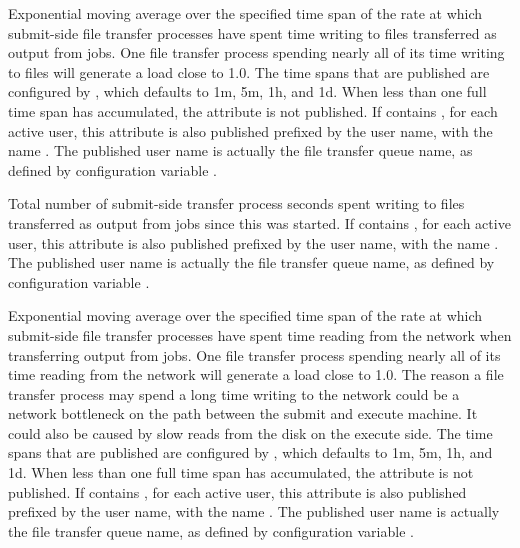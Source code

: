 \begin{description}
\item[\AdAttr{FileTransferFileWriteLoad\_<timespan>}]
  Exponential moving average over the specified time span of the rate
  at which submit-side file transfer processes have spent time writing to files
  transferred as output from jobs.  One file transfer process spending
  nearly all of its time writing to files will generate a load close
  to 1.0.
  The time spans that are published are configured by
  , which defaults to
  1m, 5m, 1h, and 1d.  When less than one full time span has
  accumulated, the attribute is not published.
  If  contains ,
  for each active user, this attribute is also published prefixed by
  the user name, with the name
  .
  The published user name is actually the file transfer queue name, as
  defined by configuration variable .

\item[\AdAttr{FileTransferFileWriteSeconds}] Total number of
  submit-side transfer process seconds spent writing to files
  transferred as output from jobs since this  was
  started.
  If  contains ,
  for each active user, this attribute is also published prefixed by
  the user name, with the name
  .
  The published user name is actually the file transfer queue name, as
  defined by configuration variable .

\item[\AdAttr{FileTransferNetReadLoad\_<timespan>}] Exponential moving
  average over the specified time span of the rate at which submit-side
  file transfer processes have spent time reading from the network
  when transferring output from jobs.  One file transfer process
  spending nearly all of its time reading from the network will
  generate a load close to 1.0.  The reason a file transfer process may
  spend a long time writing to the network could be a network
  bottleneck on the path between the submit and execute machine.  It
  could also be caused by slow reads from the disk on the execute side.
  The time spans that are published are configured by
  , which defaults to
  1m, 5m, 1h, and 1d.  When less than one full time span has
  accumulated, the attribute is not published.
  If  contains ,
  for each active user, this attribute is also published prefixed by
  the user name, with the name
  .
  The published user name is actually the file transfer queue name, as
  defined by configuration variable .


\end{description}
